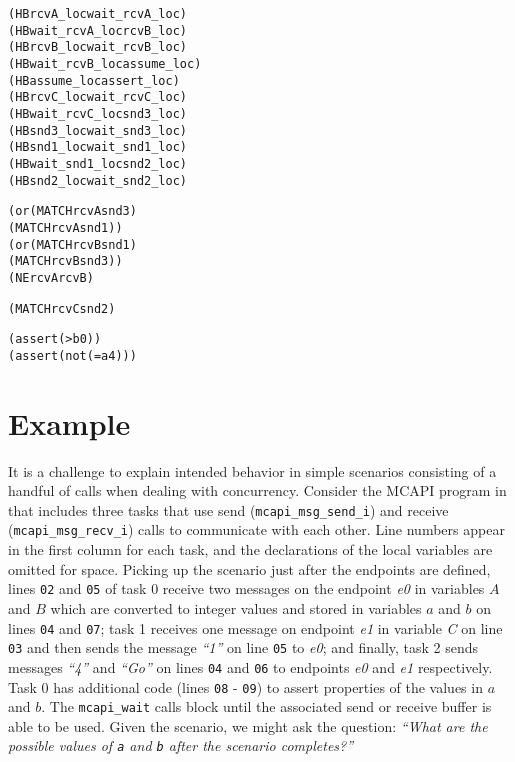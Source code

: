 \newsavebox{\boxSMT}
\begin{lrbox}{\boxSMT}
\begin{minipage}[c]{0.4\linewidth}
\begin{alltt}
(HB rcvA_loc wait_rcvA_loc)
(HB wait_rcvA_loc rcvB_loc)
(HB rcvB_loc wait_rcvB_loc)
(HB wait_rcvB_loc assume_loc)
(HB assume_loc assert_loc)
(HB rcvC_loc wait_rcvC_loc)
(HB wait_rcvC_loc snd3_loc)
(HB snd3_loc wait_snd3_loc)
(HB snd1_loc wait_snd1_loc)
(HB wait_snd1_loc snd2_loc)
(HB snd2_loc wait_snd2_loc)

(or (MATCH rcvA snd3)
    (MATCH rcvA snd1))
(or (MATCH rcvB  snd1)
    (MATCH rcvB snd3))
(NE rcvA rcvB)

(MATCH rcvC snd2)

(assert (> b 0))
(assert (not (= a 4)))
\end{alltt}
\end{minipage}
\end{lrbox}

\section{Example}

It is a challenge to explain intended behavior in simple scenarios
consisting of a handful of calls when dealing with concurrency. Consider
the MCAPI program in  that includes three
tasks that use send (\texttt{mcapi\_msg\_send\_i}) and receive
(\texttt{mcapi\_msg\_recv\_i}) calls to communicate with each other.
Line numbers appear in the first column for each task, and the
declarations of the local variables are omitted for space. Picking up
the scenario just after the endpoints are defined, lines \texttt{02}
and \texttt{05} of task 0 receive two messages on the endpoint
\textit{e0} in variables $A$ and $B$ which are
converted to integer values and stored in variables $a$ and
$b$ on lines \texttt{04} and \texttt{07}; task 1 receives one
message on endpoint \textit{e1} in variable \textit{C} on line
\texttt{03} and then sends the message \textit{``1''} on line \texttt{05} to
\textit{e0}; and finally, task 2 sends messages \textit{``4''} and \textit{``Go''} on
lines \texttt{04} and \texttt{06} to endpoints \textit{e0} and
\textit{e1} respectively. Task 0 has additional code (lines \texttt{08} -
\texttt{09}) to assert properties of the values in $a$ and
$b$. The \texttt{mcapi\_wait} calls block until the associated
send or receive buffer is able to be used. Given the scenario, we
might ask the question: \emph{``What are the possible values of
\texttt{a} and \texttt{b} after the scenario completes?''}


